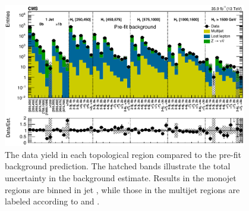 \begin{figure}
	\centering
	\includegraphics[width=0.95\textwidth]{results/figs/mt2_ALL_fullEstimate}
	\renewcommand{\baselinestretch}{1.0}
	\caption[The data yield in each topological region compared to the pre-fit background prediction.]{The data yield in each topological region compared to the pre-fit background prediction. The hatched bands illustrate the total uncertainty in the background estimate. Results in the monojet regions are binned in jet \pt, while those in the multijet regions are labeled according to \nj and \nb.}
	\label{fig:yieldPrefitTopological}
\end{figure}
